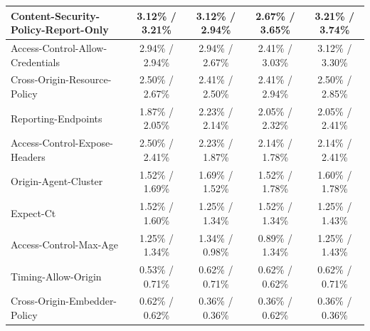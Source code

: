 \begin{table}[!ht]
\begin{tabular}{l|c|c|c|c}
        Content-Security-Policy-Report-Only & 3.12\% / 3.21\% & 3.12\% / 2.94\% & 2.67\% / 3.65\% & 3.21\% / 3.74\% \\ \hline
        Access-Control-Allow-Credentials & 2.94\% / 2.94\% & 2.94\% / 2.67\% & 2.41\% / 3.03\% & 3.12\% / 3.30\% \\ \hline
        Cross-Origin-Resource-Policy & 2.50\% / 2.67\% & 2.41\% / 2.50\% & 2.41\% / 2.94\% & 2.50\% / 2.85\% \\ \hline
        Reporting-Endpoints & 1.87\% / 2.05\% & 2.23\% / 2.14\% & 2.05\% / 2.32\% & 2.05\% / 2.41\% \\ \hline
        Access-Control-Expose-Headers & 2.50\% / 2.41\% & 2.23\% / 1.87\% & 2.14\% / 1.78\% & 2.14\% / 2.41\% \\ \hline
        Origin-Agent-Cluster & 1.52\% / 1.69\% & 1.69\% / 1.52\% & 1.52\% / 1.78\% & 1.60\% / 1.78\% \\ \hline
        Expect-Ct & 1.52\% / 1.60\% & 1.25\% / 1.34\% & 1.52\% / 1.34\% & 1.25\% / 1.43\% \\ \hline
        Access-Control-Max-Age & 1.25\% / 1.34\% & 1.34\% / 0.98\% & 0.89\% / 1.34\% & 1.25\% / 1.43\% \\ \hline
        Timing-Allow-Origin & 0.53\% / 0.71\% & 0.62\% / 0.71\% & 0.62\% / 0.62\% & 0.62\% / 0.71\% \\ \hline
        Cross-Origin-Embedder-Policy & 0.62\% / 0.62\% & 0.36\% / 0.36\% & 0.36\% / 0.62\% & 0.36\% / 0.36\% \\ \hline
    \end{tabular}
\end{table}
